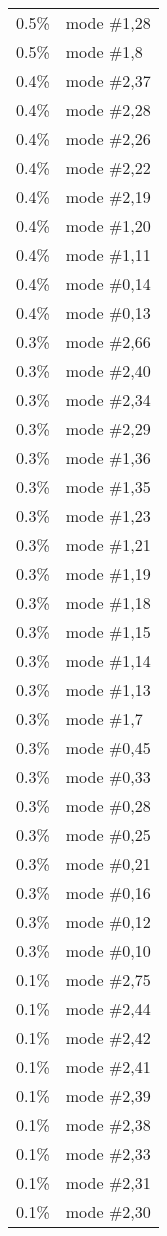 \begin{longtable}{l l}
0.5\% & mode \#1,28\\
0.5\% & mode \#1,8\\
0.4\% & mode \#2,37\\
0.4\% & mode \#2,28\\
0.4\% & mode \#2,26\\
0.4\% & mode \#2,22\\
0.4\% & mode \#2,19\\
0.4\% & mode \#1,20\\
0.4\% & mode \#1,11\\
0.4\% & mode \#0,14\\
0.4\% & mode \#0,13\\
0.3\% & mode \#2,66\\
0.3\% & mode \#2,40\\
0.3\% & mode \#2,34\\
0.3\% & mode \#2,29\\
0.3\% & mode \#1,36\\
0.3\% & mode \#1,35\\
0.3\% & mode \#1,23\\
0.3\% & mode \#1,21\\
0.3\% & mode \#1,19\\
0.3\% & mode \#1,18\\
0.3\% & mode \#1,15\\
0.3\% & mode \#1,14\\
0.3\% & mode \#1,13\\
0.3\% & mode \#1,7\\
0.3\% & mode \#0,45\\
0.3\% & mode \#0,33\\
0.3\% & mode \#0,28\\
0.3\% & mode \#0,25\\
0.3\% & mode \#0,21\\
0.3\% & mode \#0,16\\
0.3\% & mode \#0,12\\
0.3\% & mode \#0,10\\
0.1\% & mode \#2,75\\
0.1\% & mode \#2,44\\
0.1\% & mode \#2,42\\
0.1\% & mode \#2,41\\
0.1\% & mode \#2,39\\
0.1\% & mode \#2,38\\
0.1\% & mode \#2,33\\
0.1\% & mode \#2,31\\
0.1\% & mode \#2,30\\

\end{longtable}
